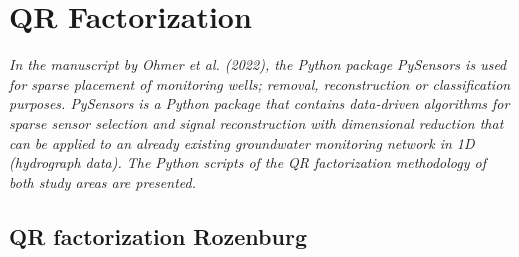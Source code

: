 \chapter{QR Factorization}

\emph{In the manuscript by Ohmer et al. (2022), the Python package PySensors is used for sparse placement of monitoring wells; removal, reconstruction or classification purposes. PySensors is a Python package that contains data-driven algorithms for sparse sensor selection and signal reconstruction with dimensional reduction that can be applied to an already existing groundwater monitoring network in 1D (hydrograph data). The Python scripts of the QR factorization methodology of both study areas are presented.}

\section{QR factorization Rozenburg}
